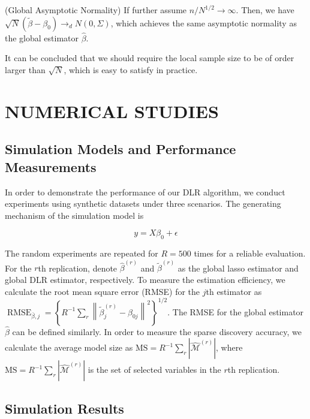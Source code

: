 \documentclass[11pt,en,authoryear]{elegantpaper}
\numberwithin{equation}{section}
\begin{document}
\begin{theorem}\label{theorem:global}
({\sc Global Asymptotic Normality}) If further assume $n / N^{1 / 2} \rightarrow \infty .$ Then, we have $\sqrt{N}\left(\tilde{\beta}-\beta_{0}\right) \rightarrow_{d} N(0, \Sigma)$, which achieves the same asymptotic normality as the global estimator $\widehat{\beta}$.
\end{theorem}
\noindent
It can be concluded that we should require the local sample size to be of order larger than $\sqrt{N}$, which is easy to satisfy in practice.

\section{NUMERICAL STUDIES}\label{sec:4}

\subsection{Simulation Models and Performance Measurements}

In order to demonstrate the performance of our DLR algorithm, we conduct experiments using synthetic datasets under three scenarios. The generating mechanism of the simulation model is 

\begin{equation}
    y = X\beta_0 + \epsilon
\end{equation}

The random experiments are repeated for $R = 500$ times for a reliable evaluation. For the $r$th replication, denote $\widehat{\beta}^{(r)}$ and $\tilde{\beta}^{(r)}$ as the global lasso estimator and global DLR estimator, respectively. To measure the estimation efficiency, we calculate the root mean square error (RMSE) for the $j$th estimator as $\operatorname{RMSE}_{\bar{\beta}, j}=\left\{R^{-1} \sum_{r}\left\|\tilde{\beta}_{j}^{(r)}-\beta_{0 j}\right\|^{2}\right\}^{1 / 2}$. The RMSE for the global estimator $\widehat{\beta}$ can be defined similarly. In order to measure the sparse discovery accuracy, we calculate the average model size as $\mathrm{MS}=R^{-1} \sum_{r}\left|\widehat{\mathcal{M}}^{(r)}\right|$, where $\mathrm{MS}=R^{-1} \sum_{r}\left|\widehat{\mathcal{M}}^{(r)}\right|$ is the set of selected variables in the $r$th replication.



\subsection{Simulation Results}
\end{document}
